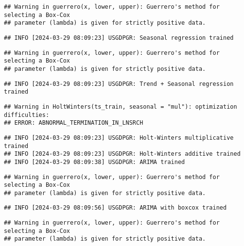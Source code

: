 \documentclass[
]{article}
\begin{document}
\begin{verbatim}
## Warning in guerrero(x, lower, upper): Guerrero's method for selecting a Box-Cox
## parameter (lambda) is given for strictly positive data.
\end{verbatim}

\begin{verbatim}
## INFO [2024-03-29 08:09:23] USGDPGR: Seasonal regression trained
\end{verbatim}

\begin{verbatim}
## Warning in guerrero(x, lower, upper): Guerrero's method for selecting a Box-Cox
## parameter (lambda) is given for strictly positive data.
\end{verbatim}

\begin{verbatim}
## INFO [2024-03-29 08:09:23] USGDPGR: Trend + Seasonal regression trained
\end{verbatim}

\begin{verbatim}
## Warning in HoltWinters(ts_train, seasonal = "mul"): optimization difficulties:
## ERROR: ABNORMAL_TERMINATION_IN_LNSRCH
\end{verbatim}

\begin{verbatim}
## INFO [2024-03-29 08:09:23] USGDPGR: Holt-Winters multiplicative trained
## INFO [2024-03-29 08:09:23] USGDPGR: Holt-Winters additive trained
## INFO [2024-03-29 08:09:38] USGDPGR: ARIMA trained
\end{verbatim}

\begin{verbatim}
## Warning in guerrero(x, lower, upper): Guerrero's method for selecting a Box-Cox
## parameter (lambda) is given for strictly positive data.
\end{verbatim}

\begin{verbatim}
## INFO [2024-03-29 08:09:56] USGDPGR: ARIMA with boxcox trained
\end{verbatim}

\begin{verbatim}
## Warning in guerrero(x, lower, upper): Guerrero's method for selecting a Box-Cox
## parameter (lambda) is given for strictly positive data.
\end{verbatim}
\end{document}
